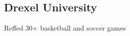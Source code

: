 \documentclass[]{deedy-resume-openfont}
\begin{document}
\begin{minipage}[t]{0.66\textwidth}
    \subsection{Drexel University}
    \begin{tightemize}
    \item Reffed 30+ basketball and soccer games
    \end{tightemize}
    \sectionsep



\end{minipage}
\end{document}
